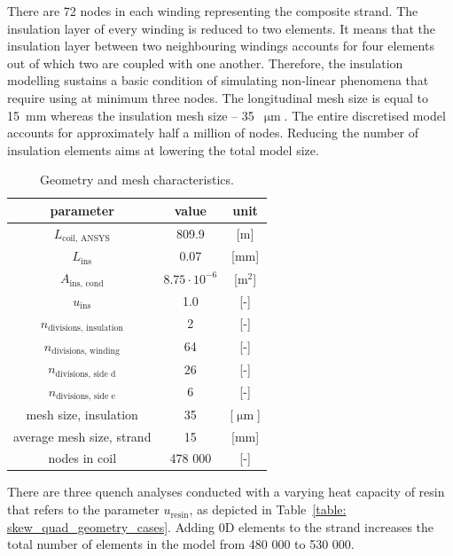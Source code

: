 There are 72 nodes in each winding representing the composite strand. The insulation layer of every winding is reduced to two elements. It means that the insulation layer between two neighbouring windings accounts for four elements out of which two are coupled with one another. Therefore, the insulation modelling sustains a basic condition of simulating non-linear phenomena that require using at minimum three nodes. The longitudinal mesh size is equal to 15~mm whereas the insulation mesh size -- 35~$\upmu \text{m}$. The entire discretised model accounts for approximately half a million of nodes. Reducing the number of insulation elements aims at lowering the total model size.

\begin{table}[H]
    \caption{Geometry and mesh characteristics.} 
    \vspace{-1.em} 
    \fontsize{10}{10}
    \selectfont 
    \renewcommand{\arraystretch}{1.5}
    \begin{center}
        \begin{tabular}{ ccc }  
        \hline
        parameter & value & unit \\
        \hline
        $L_\text{coil, ANSYS}$ & 809.9 & [m] \\
        $L_\text{ins}$ & 0.07 & [mm] \\
        $A_\text{ins, cond}$ & $8.75 \cdot 10^{-6}$ & [$\text{m}^2$] \\
        $u_\text{ins}$ & 1.0 & [-] \\
        $n_\text{divisions, insulation}$ & 2 & [-] \\
        $n_\text{divisions, winding}$ & 64 & [-] \\
        $n_\text{divisions, side d}$ & 26 & [-] \\
        $n_\text{divisions, side e}$ & 6 & [-] \\
        mesh size, insulation & 35 & [$\upmu \text{m}$] \\
        average mesh size, strand & 15 & [mm] \\ 
        nodes in coil & 478 000 & [-] \\
        \hline 
        \end{tabular}
    \end{center}  
     \label{table: skew_quad_geometry_mesh} 
 \end{table}

There are three quench analyses conducted with a varying heat capacity of resin that refers to the parameter $u_\text{resin}$, as depicted in Table~\ref{table: skew_quad_geometry_cases}. Adding 0D elements to the strand increases the total number of elements in the model from 480 000 to 530 000. 

